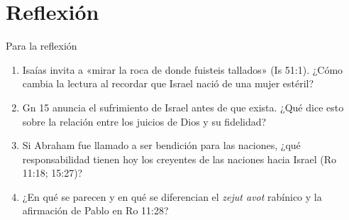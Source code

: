 \section{Reflexión}
\begin{frame}{Para la reflexión}
\begin{enumerate}\setlength{\itemsep}{10pt}
\item Isaías invita a «mirar la roca de donde fuisteis tallados» (Is 51:1). ¿Cómo cambia la lectura al recordar que Israel nació de una mujer estéril?
\item Gn 15 anuncia el sufrimiento de Israel antes de que exista. ¿Qué dice esto sobre la relación entre los juicios de Dios y su fidelidad?
\item Si Abraham fue llamado a ser bendición para las naciones, ¿qué responsabilidad tienen hoy los creyentes de las naciones hacia Israel (Ro 11:18; 15:27)?
\item ¿En qué se parecen y en qué se diferencian el \emph{zejut avot} rabínico y la afirmación de Pablo en Ro 11:28?
\end{enumerate}
\end{frame}

